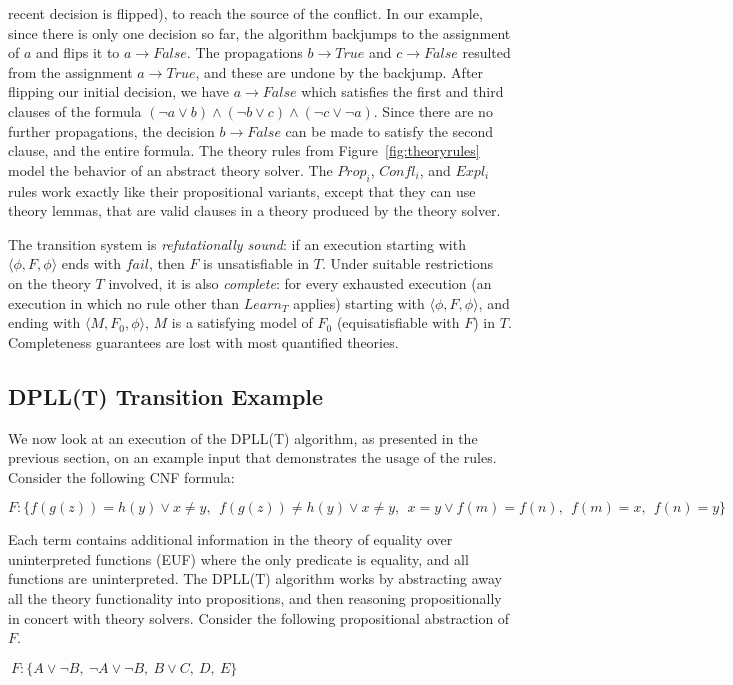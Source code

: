 \documentclass{article}
\begin{document}
	recent decision is flipped), to 
	reach the source of the conflict.
	In our example, since there is only 
	one decision so far, the algorithm
	backjumps to the assignment of 
	$a$ and flips it to $a \to False$. The 
	propagations $b \to True$ and $c \to 
	False$ resulted from the assignment 
	$a \to True$, and these are undone
	by the backjump. After flipping our 
	initial decision, we have $a \to 
	False$ which satisfies
	the first and third clauses of the 
	formula $(\neg a \lor b) \land 
	(\neg b \lor c) \land (\neg c 
	\lor \neg a)$. Since there 
	are no further propagations, the 
	decision $b \to False$ can be made 
	to satisfy the second clause, and the 
	entire formula. The theory rules
	from Figure~\ref{fig:theoryrules} model 
	the behavior of an abstract 
	theory solver. The $Prop_i$, 
	$Confl_i$, and $Expl_i$ rules
	work exactly like their 
	propositional variants, except 
	that they can use theory lemmas, 
	that are valid clauses in a 
	theory produced by the theory
	solver. 
	
	The transition system is 
	\textit{refutationally sound}:
	if an execution starting with 
	$\langle \phi, F, \phi \rangle$ ends 
	with $fail$, then $F$ is 
	unsatisfiable in $T$. Under suitable 
	restrictions on the theory $T$ 
	involved, it is also 
	\textit{complete}: for every exhausted
	execution (an execution in which no 
	rule other than $Learn_T$ applies)
	starting with 
	$\langle \phi, F, \phi \rangle$,
	and ending with 
	$\langle M, F_0, \phi \rangle$,
	$M$ is a satisfying model of 
	$F_0$ (equisatisfiable with $F$)
	in $T$.
	Completeness guarantees are lost with
	most quantified theories.
	
	
	\subsection{DPLL(T) Transition Example}
	\label{sec:transex}
	We now look at an execution of the 
	DPLL(T) algorithm, as presented in the 
	previous section, on an example input
	that demonstrates the usage of 
	the rules. Consider the following 
	CNF formula:
	\begin{center}
		$ F: \{f(g(z)) = h(y) \lor x \neq y,\ \ 
		f(g(z)) \neq h(y) \lor x \neq y,\ \ 
		x = y \lor f(m) = f(n),\ \ 
		f(m) = x,\ \ f(n) = y\}$
	\end{center}
	Each term contains 
	additional information in the theory 
	of equality over uninterpreted 
	functions (EUF) where the only 
	predicate is equality, and all
	functions are uninterpreted. The 
	DPLL(T) algorithm
	works by abstracting away all the 
	theory functionality into 
	propositions, and then 
	reasoning propositionally in 
	concert with theory solvers. 
	Consider the following propositional
	abstraction of $F$.
	\begin{center}
		$\ F: \{A \lor \neg B,\ \neg A \lor 
			\neg B,\ B \lor C,\ D,\ E\}$
	\end{center}
\end{document}
